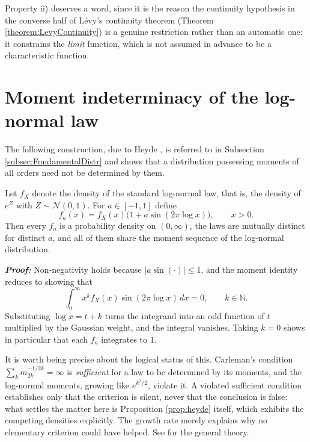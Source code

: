 Property ii) deserves a word, since it is the reason the continuity hypothesis in the converse
half of Lévy's continuity theorem (Theorem \ref{theorem:LevyContinuity}) is a genuine restriction
rather than an automatic one: it constrains the \emph{limit} function, which is not assumed in
advance to be a characteristic function.

\section{Moment indeterminacy of the log-normal law}\label{app:heyde}

The following construction, due to Heyde \cite{heyde1963}, is referred to in Subsection
\ref{subsec:FundamentalDistr} and shows that a distribution possessing moments of all orders need not be
determined by them.

\begin{proposition}[Heyde]\label{prop:heyde}
Let $f_X$ denote the density of the standard log-normal law, that is, the density of $e^{Z}$ with
$Z \sim \mathcal{N}(0,1)$. For $a \in [-1,1]$ define
\begin{equation}\label{eq:heyde}
f_a(x) = f_X(x)\bigl(1 + a \sin(2\pi \log x)\bigr), \qquad x>0.
\end{equation}
Then every $f_a$ is a probability density on $(0,\infty)$, the laws are mutually distinct for
distinct $a$, and all of them share the moment sequence of the log-normal distribution.
\end{proposition}

\textbf{\textit{Proof:}} Non-negativity holds because $|a\sin(\cdot)| \leq 1$, and the moment identity reduces to showing that
\[
\int_0^\infty x^k f_X(x)\sin(2\pi \log x)\,dx = 0, \qquad k \in \mathbb{N}.
\]
Substituting $\log x = t + k$ turns the integrand into an odd function of $t$ multiplied by the
Gaussian weight, and the integral vanishes. Taking $k=0$ shows in particular that each $f_a$
integrates to $1$. \qedfilledtext

It is worth being precise about the logical status of this. Carleman's condition
$\sum_k m_{2k}^{-1/2k} = \infty$ is \emph{sufficient} for a law to be determined by its moments, and
the log-normal moments, growing like $e^{k^2/2}$, violate it. A violated sufficient condition
establishes only that the criterion is silent, never that the conclusion is false: what settles the
matter here is Proposition \ref{prop:heyde} itself, which exhibits the competing densities
explicitly. The growth rate merely explains why no elementary criterion could have helped. See
\cite{durrett2019} for the general theory.

